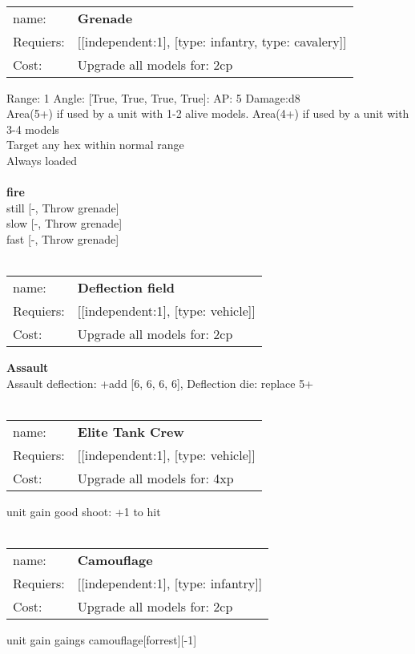 \ \\
\begin{tabular}{ll}
name: & {\bf Grenade } \\
Requiers: & [[independent:1], [type: infantry, type: cavalery]] \\
Cost: & Upgrade all models for: 2cp \\
\end{tabular}



Range: 1  Angle: [True, True, True, True]: AP: 5 Damage:d8 \\
Area(5+) if used by a unit with 1-2 alive models. Area(4+) if used by a unit with 3-4 models\\ 
Target any hex within normal range\\ 
Always loaded\\ 







\ \\ {\bf fire } \\
still [-, Throw grenade] \\
slow [-, Throw grenade] \\
fast [-, Throw grenade] \\

\ \\
\begin{tabular}{ll}
name: & {\bf Deflection field } \\
Requiers: & [[independent:1], [type: vehicle]] \\
Cost: & Upgrade all models for: 2cp \\
\end{tabular}





{\bf Assault} \ \\
Assault deflection: +add [6, 6, 6, 6], Deflection die: replace 5+
\\ 




\ \\
\begin{tabular}{ll}
name: & {\bf Elite Tank Crew } \\
Requiers: & [[independent:1], [type: vehicle]] \\
Cost: & Upgrade all models for: 4xp \\
\end{tabular}

unit gain good shoot: +1 to hit\\ 









\ \\
\begin{tabular}{ll}
name: & {\bf Camouflage } \\
Requiers: & [[independent:1], [type: infantry]] \\
Cost: & Upgrade all models for: 2cp \\
\end{tabular}

unit gain gaings camouflage[forrest][-1]\\ 









